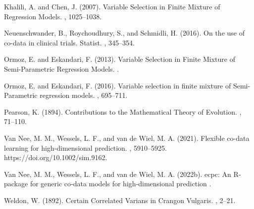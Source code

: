 \begin{thebibliography}{}
	
Khalili, A. and Chen, J. (2007).
\newblock  Variable Selection in Finite Mixture of Regression Models.
,
1025--1038.	


Neuenschwander, B., Roychoudhury, S., and Schmidli, H. (2016).
\newblock On the use of co-data in clinical trials. Statist.
,
345--354.



Ormoz, E. and Eskandari, F. (2013).
\newblock Variable Selection in Finite Mixture of Semi-Parametric Regression Models.
.


Ormoz, E. and Eskandari, F. (2016).
\newblock Variable selection in finite mixture of Semi-Parametric regression models.
,
695--711.


Pearson, K. (1894).
\newblock Contributions to the Mathematical Theory of Evolution.
,
71--110.

Van Nee, M. M., Wessels, L. F., and van de Wiel, M. A. (2021).
\newblock Flexible co-data learning for high-dimensional prediction.
,
5910--5925.
\newblock https://doi.org/10.1002/sim.9162.


Van Nee, M. M., Wessels, L. F., and van de Wiel, M. A. (2022b).
\newblock ecpc: An R‐package for generic co‐data models for high‐dimensional prediction
.



Weldon, W. (1892).
\newblock Certain Correlated Varians in Crangon Vulgaris.
,
2--21.


\end{thebibliography}

